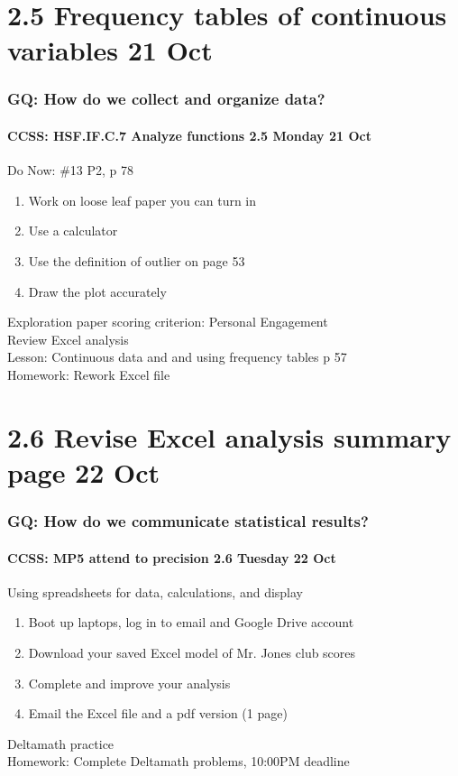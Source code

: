 \documentclass{beamer}
\begin{document}
  \section{2.5 Frequency tables of continuous variables 21 Oct}
  \frame
  {
    \frametitle{GQ: How do we collect and organize data?}
    \framesubtitle{CCSS: HSF.IF.C.7 Analyze functions \hfill \alert{2.5 Monday 21 Oct}}

    \begin{block}{Do Now: \#13 P2, p 78}
    \begin{enumerate}
        \item Work on loose leaf paper you can turn in
        \item Use a calculator
        \item Use the definition of outlier on page 53
        \item Draw the plot accurately
    \end{enumerate}
    \end{block}
    Exploration paper scoring criterion: Personal Engagement \\
    Review Excel analysis \\
    Lesson: Continuous data and and using frequency tables p 57\\ \smallskip
    Homework: Rework Excel file
  }

  \section{2.6 Revise Excel analysis summary page 22 Oct}
  \frame
  {
    \frametitle{GQ: How do we communicate statistical results?}
    \framesubtitle{CCSS: MP5 attend to precision \hfill \alert{2.6 Tuesday 22 Oct}}

    \begin{block}{Using spreadsheets for data, calculations, and display}
      \begin{enumerate}
        \item Boot up laptops, log in to email and Google Drive account
        \item Download your saved Excel model of Mr. Jones club scores
        \item Complete and improve your analysis
        \item Email the Excel file and a pdf version (1 page)
    \end{enumerate}
    \end{block}
    Deltamath practice\\ \smallskip
    Homework: Complete Deltamath problems, 10:00PM deadline
  }
\end{document}
